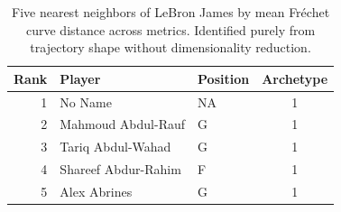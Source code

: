 \begin{table}[htbp]
  \centering\small
  \begin{tabular}{rllc}
    \toprule
    Rank & Player & Position & Archetype \\
    \midrule
    1 & No Name & NA & 1 \\
    2 & Mahmoud Abdul-Rauf & G & 1 \\
    3 & Tariq Abdul-Wahad & G & 1 \\
    4 & Shareef Abdur-Rahim & F & 1 \\
    5 & Alex Abrines & G & 1 \\
    \bottomrule
  \end{tabular}
  \caption{Five nearest neighbors of LeBron James by mean Fr\'{e}chet curve distance across metrics. Identified purely from trajectory shape without dimensionality reduction.}
\end{table}

